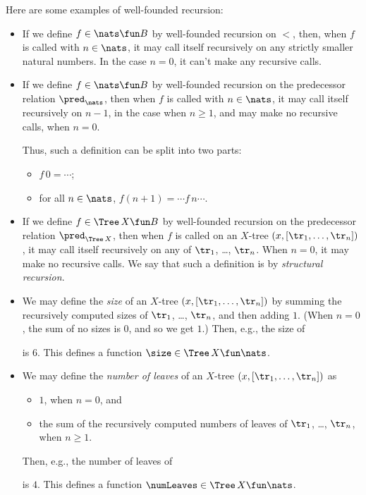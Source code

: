 Here are some examples of well-founded recursion:
\begin{itemize}
\item If we define $f\in\nats\fun B$ by well-founded recursion on
$<$, then, when $f$ is called with $n\in\nats$, it may call itself
recursively on any strictly smaller natural numbers.
In the case $n=0$, it can't make any recursive calls.

\item If we define $f\in\nats\fun B$ by well-founded recursion on
the predecessor relation $\pred_\nats$, then when $f$ is called with
$n\in\nats$, it may call itself recursively on $n-1$, in the
case when $n\geq 1$, and may make no recursive calls, when $n=0$.

Thus, such a definition can be split into two parts:
\begin{itemize}
\item $f\,0 = \cdots$;

\item for all $n\in\nats$, $f(n + 1) = \cdots f\,n \cdots$.
\end{itemize}

\item If we define $f\in\Tree\,X\fun B$ by well-founded recursion
on the predecessor relation $\pred_{\Tree\,X}$, then when $f$ is
called on an $X$-tree $(x,[\tr_1,\ldots,\tr_n])$, it may call itself
recursively on any of $\tr_1$, \ldots, $\tr_n$.  When $n=0$,
it may make no recursive calls.
We say that such a definition is by \emph{structural recursion}.

\item
We may define the \emph{size} of an $X$-tree
$(x,[\tr_1,\ldots,\tr_n])$ by summing the recursively computed sizes
of $\tr_1$, \ldots, $\tr_n$, and then adding $1$. (When $n=0$,
the sum of no sizes is $0$, and so we get $1$.) Then, e.g.,
the size of
\begin{center}

\end{center}
is $6$. This defines a function ${\size}\in\Tree\,X\fun\nats$.

\item
We may define the \emph{number of leaves} of an $X$-tree
$(x,[\tr_1,\ldots,\tr_n])$ as
\begin{itemize}
\item $1$, when $n=0$, and

\item the sum of the recursively computed numbers of leaves of
  $\tr_1$, \ldots, $\tr_n$, when $n\geq 1$.
\end{itemize}
Then, e.g., the number of leaves of
\begin{center}

\end{center}
is $4$. This defines a function ${\numLeaves}\in\Tree\,X\fun\nats$.


\end{itemize}
